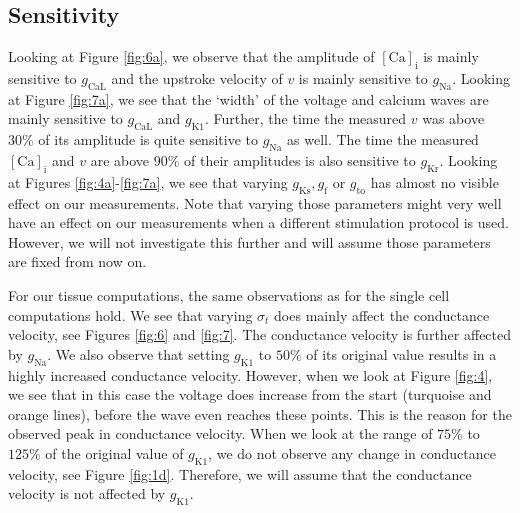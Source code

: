 \documentclass{article}
\begin{document}
\subsection{Sensitivity} \label{Sensitivity}
Looking at Figure \ref{fig:6a}, we observe that the amplitude of $[\mathrm{Ca}]_{\mathrm{i}}$ is mainly sensitive to $g_{\mathrm{CaL}}$ and the upstroke velocity of $v$ is mainly sensitive to $g_{\mathrm{Na}}$. Looking at Figure \ref{fig:7a}, we see that the `width' of the voltage and calcium waves are mainly sensitive to $g_{\mathrm{CaL}}$ and $g_{\mathrm{K1}}$. Further, the time the measured $v$ was above $30\%$ of its amplitude is quite sensitive to $g_{\mathrm{Na}}$ as well. The time the measured $[\mathrm{Ca}]_{\mathrm{i}}$ and $v$ are above $90\%$ of their amplitudes is also sensitive to $g_{\mathrm{Kr}}$. Looking at Figures \ref{fig:4a}-\ref{fig:7a}, we see that varying $g_{\mathrm{Ks}}, g_{\mathrm{f}}$ or $g_{\mathrm{to}}$ has almost no visible effect on our measurements. Note that varying those parameters might very well have an effect on our measurements when a different stimulation protocol is used. However, we will not investigate this further and will assume those parameters are fixed from now on. 

For our tissue computations, the same observations as for the single cell computations hold. We see that varying $\sigma_t$ does mainly affect the conductance velocity, see Figures \ref{fig:6} and \ref{fig:7}. The conductance velocity is further affected by $g_{\mathrm{Na}}$. We also observe that setting $g_{\mathrm{K1}}$ to $50\%$ of its original value results in a highly increased conductance velocity. However, when we look at Figure \ref{fig:4}, we see that in this case the voltage does increase from the start (turquoise and orange lines), before the wave even reaches these points. This is the reason for the observed peak in conductance velocity. When we look at the range of $75\%$ to $125\%$ of the original value of $g_{\mathrm{K1}}$, we do not observe any change in conductance velocity, see Figure \ref{fig:1d}. Therefore, we will assume that the conductance velocity is not affected by $g_{\mathrm{K1}}$.
%
\end{document}
